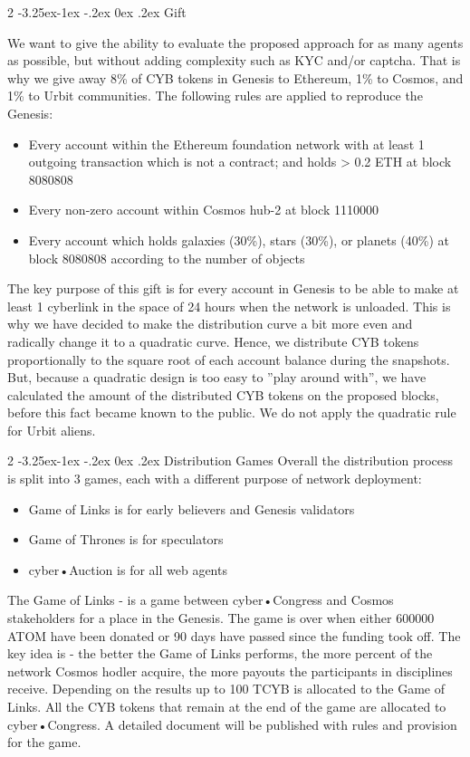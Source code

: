 \documentclass[8pt,oneside]{amsart}
\makeatletter
\renewcommand\subsection{\@startsection{subsection}
                                    {2}{\z@}
                                    {-3.25ex\@plus -1ex \@minus -.2ex}
                                    {0ex \@plus .2ex}
                                    {\play\Large}
                        }
\newcommand{\titleSection}[1]{\subsection{#1}}
\makeatother
\begin{document}
\titleSection{Gift}\label{Gift}

We want to give the ability to evaluate the proposed approach for as many agents as possible, but without adding complexity such as KYC and/or captcha. That is why we give away 8\% of CYB tokens in Genesis to Ethereum, 1\% to Cosmos, and 1\% to Urbit communities. The following rules are applied to reproduce the Genesis:
\begin{itemize}
\item Every account within the Ethereum foundation network with at least 1 outgoing transaction which is not a contract; and
holds > 0.2 ETH at block 8080808
\item Every non-zero account within Cosmos hub-2 at block 1110000
\item Every account which holds galaxies (30\%), stars (30\%), or planets (40\%) at block 8080808 according to the number of objects
\end{itemize}

The key purpose of this gift is for every account in Genesis to be able to make at least 1 cyberlink in the space of 24 hours when the network is unloaded. This is why we have decided to make the distribution curve a bit more even and radically change it to a quadratic curve. Hence, we distribute CYB tokens proportionally to the square root of each account balance during the snapshots. But, because a quadratic design is too easy to ”play around with”, we have calculated the amount of the distributed CYB tokens on the proposed blocks, before this fact became known to the public. We do not apply the quadratic rule for Urbit aliens.

\titleSection{Distribution Games}\label{Distribution Games}
Overall the distribution process is split into 3 games, each with a different purpose of network deployment:
\begin{itemize}
\item Game of Links is for early believers and Genesis validators
\item Game of Thrones is for speculators
\item cyber•Auction is for all web agents
\end{itemize}

The Game of Links - is a game between cyber•Congress and Cosmos stakeholders for a place in the Genesis. The game is over when either 600000 ATOM have been donated or 90 days have passed since the funding took off. The key idea is - the better the Game of Links performs, the more percent of the network Cosmos hodler acquire, the more payouts the participants in disciplines receive. Depending on the results up to 100 TCYB is allocated to the Game of Links. All the CYB tokens that remain at the end of the game are allocated to cyber•Congress. A detailed document will be published with rules and provision for the game.
\end{document}
